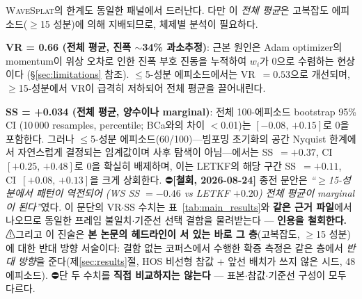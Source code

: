 \documentclass[11pt]{report}
\numberwithin{equation}{chapter}
\numberwithin{figure}{chapter}
\numberwithin{table}{chapter}
\newcommand{\WS}{\textsc{WaveSplat}}
\begin{document}
\WS{}의 한계도 동일한 패널에서 드러난다.
다만 이 \emph{전체 평균}은 고복잡도 에피소드($\geq$15 성분)에 의해
지배되므로, 체제별 분석이 필요하다.

\textbf{VR = 0.66 (전체 평균, 진폭 $\sim$34\% 과소추정)}:
근본 원인은 Adam optimizer의 momentum이 위상 오차로 인한
진폭 부호 진동을 누적하여 $w_i$가 0으로 수렴하는 현상이다
(§\ref{sec:limitations} 참조).
$\leq$5-성분 에피소드에서는 VR~$=0.53$으로 개선되며,
$\geq$15-성분에서 VR이 급격히 저하되어 전체 평균을 끌어내린다.

\textbf{SS = +0.034 (전체 평균, 양수이나 marginal)}:
전체 100-에피소드 bootstrap 95\% CI (10\,000 resamples, percentile;
BCa와의 차이 $<$0.01)는 $[{-0.08},\,{+0.15}]$로 0을 포함한다.
그러나 $\leq$5-성분 에피소드(60/100)---빔포밍 초기화의 공간 Nyquist 한계에서
자연스럽게 결정되는 임계값이며 사후 탐색이 아님---에서는
SS~$=+0.37$, CI~$[{+0.25},\,{+0.48}]$로 0을 확실히 배제하며,
이는 LETKF의 해당 구간 SS~$=+0.11$, CI~$[{+0.08},\,{+0.13}]$을
크게 상회한다.
⛔\textbf{[철회, 2026-08-24]} 종전 문안은 \emph{``$\geq$15-성분에서 패턴이 역전되어
(WS SS $=-0.46$ vs LETKF $+0.20$) 전체 평균이 marginal이 된다''}였다.
이 문단의 VR$\cdot$SS 수치는 표~\ref{tab:main_results}와 \textbf{같은 근거 파일}에서
나오므로 동일한 프레임 불일치$\cdot$기준선 선택 결함을 물려받는다 --- \textbf{인용을 철회한다.}
⚠그리고 이 진술은 \textbf{본 논문의 헤드라인이 서 있는 바로 그 층}(고복잡도, $\geq$15 성분)에
대한 반대 방향 서술이다: 결함 없는 코퍼스에서 수행한 확증 측정은 같은 층에서
\emph{반대 방향}을 준다(제\ref{sec:results}절, HOS 비선형 참값 + 앞선 배치가 쓰지 않은 시드, 48 에피소드).
⛔단 두 수치를 \textbf{직접 비교하지는 않는다} --- 표본$\cdot$참값$\cdot$기준선 구성이 모두 다르다.
\end{document}
